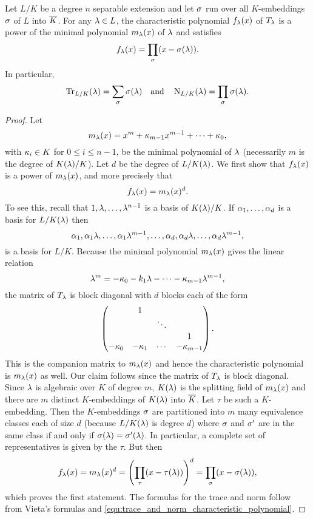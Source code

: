     \begin{proposition}\label{prop:formulas_for_trace_and_norm}
      Let $L/K$ be a degree $n$ separable extension and let $\sigma$ run over all $K$-embeddings $\sigma$ of $L$ into $\overline{K}$. For any $\lambda \in L$, the characteristic polynomial $f_{\lambda}(x)$ of $T_{\lambda}$ is a power of the minimal polynomial $m_{\lambda}(x)$ of $\lambda$ and satisfies
      \[
        f_{\lambda}(x) = \prod_{\sigma}(x-\sigma(\lambda)).
      \]
      In particular,
      \[
        \operatorname{\mathrm{Tr}}_{L/K}(\lambda) = \sum_{\sigma}\sigma(\lambda) \quad \text{and} \quad \operatorname{\mathrm{N}}_{L/K}(\lambda) = \prod_{\sigma}\sigma(\lambda).
      \]
    \end{proposition}
    \begin{proof}
      Let
      \[
        m_{\lambda}(x) = x^{m}+\kappa_{m-1}x^{m-1}+\cdots+\kappa_{0},
      \]
      with $\kappa_{i} \in K$ for $0 \le i \le n-1$, be the minimal polynomial of $\lambda$ (necessarily $m$ is the degree of $K(\lambda)/K$). Let $d$ be the degree of $L/K(\lambda)$. We first show that $f_{\lambda}(x)$ is a power of $m_{\lambda}(x)$, and more precisely that
      \[
        f_{\lambda}(x) = m_{\lambda}(x)^{d}.
      \]
      To see this, recall that $1,\lambda,\ldots,\lambda^{n-1}$ is a basis of $K(\lambda)/K$. If $\alpha_{1},\ldots,\alpha_{d}$ is a basis for $L/K(\lambda)$ then
      \[
        \alpha_{1},\alpha_{1}\lambda,\ldots,\alpha_{1}\lambda^{m-1},\ldots,\alpha_{d},\alpha_{d}\lambda,\ldots,\alpha_{d}\lambda^{m-1},
      \]
      is a basis for $L/K$. Because the minimal polynomial $m_{\lambda}(x)$ gives the linear relation
      \[
        \lambda^{m} = -\kappa_{0}-k_{1}\lambda-\cdots-\kappa_{m-1}\lambda^{m-1},
      \]
      the matrix of $T_{\lambda}$ is block diagonal with $d$ blocks each of the form
      \[
        \begin{pmatrix} & 1 & & \\ & & \ddots & \\ & & & 1 \\ -\kappa_{0} & -\kappa_{1} & \cdots & -\kappa_{m-1} \\ \end{pmatrix}.
      \]
      This is the companion matrix to $m_{\lambda}(x)$ and hence the characteristic polynomial is $m_{\lambda}(x)$ as well. Our claim follows since the matrix of $T_{\lambda}$ is block diagonal. Since $\lambda$ is algebraic over $K$ of degree $m$, $K(\lambda)$ is the splitting field of $m_{\lambda}(x)$ and there are $m$ distinct $K$-embeddings of $K(\lambda)$ into $\overline{K}$. Let $\tau$ be such a $K$-embedding. Then the $K$-embeddings $\sigma$ are partitioned into $m$ many equivalence classes each of size $d$ (because $L/K(\lambda)$ is degree $d$) where $\sigma$ and $\sigma'$ are in the same class if and only if $\sigma(\lambda) = \sigma'(\lambda)$. In particular, a complete set of representatives is given by the $\tau$. But then
      \[
        f_{\lambda}(x) = m_{\lambda}(x)^{d} = \left(\prod_{\tau}(x-\tau(\lambda))\right)^{d} = \prod_{\sigma}(x-\sigma(\lambda)),
      \]
      which proves the first statement. The formulas for the trace and norm follow from Vieta's formulas and \cref{equ:trace_and_norm_characteristic_polynomial}.
    \end{proof}

